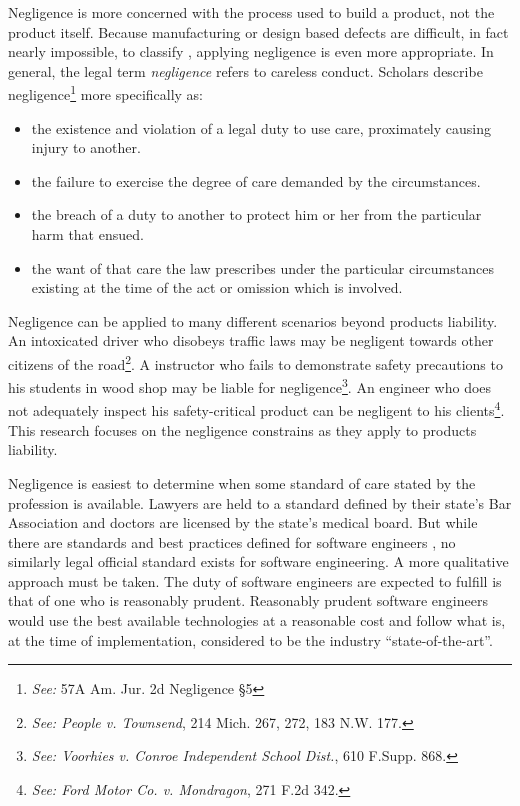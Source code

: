 \documentclass[12pt]{report}
\begin{document}
Negligence is more concerned with the process used to build a product, not the product itself. Because manufacturing or design based defects are difficult, in fact nearly impossible, to classify \cite{Turner99}, applying negligence is even more appropriate. In general, the legal term \textit{negligence} refers to careless conduct. Scholars describe negligence\footnote{\textit{See:} 57A Am. Jur. 2d Negligence \S 5} more specifically as:\singlespace
\begin{itemize}
 \item the existence and violation of a legal duty to use care, proximately 
 causing injury to another.
 \item the failure to exercise the degree of care demanded by the circumstances.
 \item the breach of a duty to another to protect him or her from the particular
 harm that ensued.
 \item the want of that care the law prescribes under the particular
 circumstances existing at the time of the act or omission which is involved.
\end{itemize}\doublespace
Negligence can be applied to many different scenarios beyond products liability. An intoxicated driver who disobeys traffic laws may be negligent towards other citizens of the road\footnote{\textit{See: People v. Townsend}, 214 Mich. 267, 272, 183 N.W. 177.}. A instructor who fails to demonstrate safety precautions to his students in wood shop may be liable for negligence\footnote{\textit{See: Voorhies v. Conroe Independent School Dist.}, 610 F.Supp. 868.}. An engineer who does not adequately inspect his safety-critical product can be negligent to his clients\footnote{\textit{See: Ford Motor Co. v. Mondragon}, 271 F.2d 342.}. This research focuses on the negligence constrains as they apply to products liability.

Negligence is easiest to determine when some standard of care stated by the profession is available. Lawyers are held to a standard defined by their state's Bar Association and doctors are licensed by the state's medical board. But while there are standards and best practices defined for software engineers \cite{FAKE}, no similarly legal official standard exists for software engineering. A more qualitative approach must be taken. The duty of software engineers are expected to fulfill is that of one who is reasonably prudent. Reasonably prudent software engineers would use the best available technologies at a reasonable cost and follow what is, at the time of implementation, considered to be the industry ``state-of-the-art''.
\end{document}
